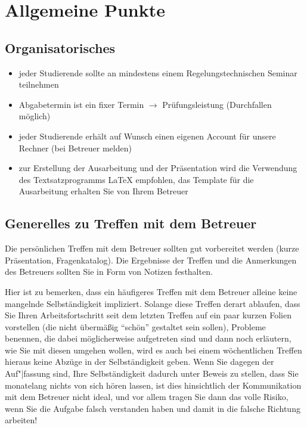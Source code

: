 \section{Allgemeine Punkte}

\subsection*{Organisatorisches}
\label{sec:Organisatorisches}

\begin{itemize}
  \item jeder Studierende sollte an mindestens einem Regelungstechnischen Seminar teilnehmen
  \item Abgabetermin ist ein fixer Termin $\rightarrow$ Prüfungsleistung (Durchfallen möglich)
  \item jeder Studierende erhält auf Wunsch einen eigenen Account für unsere Rechner (bei Betreuer melden)
  \item zur Erstellung der Ausarbeitung und der Präsentation wird die Verwendung des Textsatzprogramms \LaTeX{} empfohlen, das Template für die Ausarbeitung erhalten Sie von Ihrem Betreuer
\end{itemize}




\subsection*{Generelles zu Treffen mit dem Betreuer}
\label{sec:TreffenBetreuer}

Die persönlichen Treffen mit dem Betreuer sollten gut vorbereitet werden (\zB kurze Präsentation, Fragenkatalog).
Die Ergebnisse der Treffen und die Anmerkungen des Betreuers sollten Sie in Form von Notizen festhalten.


Hier ist zu bemerken, dass ein häufigeres Treffen mit dem Betreuer alleine keine mangelnde Selbständigkeit impliziert.
Solange diese Treffen derart ablaufen, dass Sie Ihren Arbeitsfortschritt seit dem letzten Treffen auf \zB ein paar kurzen Folien vorstellen (die nicht übermäßig "`schön"' gestaltet sein sollen), Probleme benennen, die dabei möglicherweise aufgetreten sind und dann noch erläutern, wie Sie mit diesen umgehen wollen, wird es auch bei einem wöchentlichen Treffen hieraus keine Abzüge in der Selbständigkeit geben.
Wenn Sie dagegen der Auf"|fassung sind, Ihre Selbständigkeit dadurch unter Beweis zu stellen, dass Sie monatelang nichts von sich hören lassen, ist dies hinsichtlich der Kommunikation mit dem Betreuer nicht ideal, und vor allem tragen Sie dann das volle Risiko, wenn Sie die Aufgabe falsch verstanden haben und damit in die falsche Richtung arbeiten!




